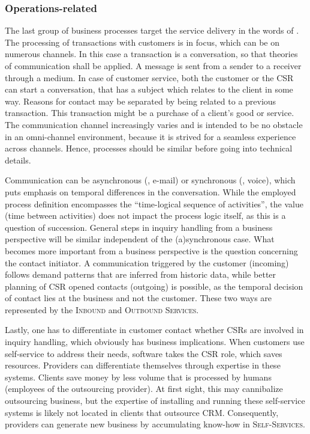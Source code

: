 	\subsubsection{Operations-related}
	The last group of business processes target the service delivery in the words of \citeauthor{schewe2007}. The processing of transactions with customers is in focus, which can be on numerous channels. In this case a transaction is a conversation, so that theories of communication \citep{shannon1949} shall be applied. A message is sent from a sender to a receiver through a medium. In case of customer service, both the customer or the \acrshort{CSR} can start a conversation, that has a subject which relates to the client in some way. Reasons for contact may be separated by being related to a previous transaction. This transaction might be a purchase of a client's good or service. The communication channel increasingly varies and is intended to be no obstacle in an omni-channel environment, because it is strived for a seamless experience across channels. Hence, processes should be similar before going into technical details. 
	
	Communication can be asynchronous (\eg, e-mail) or synchronous (\eg, voice), which puts emphasis on temporal differences in the conversation. While the employed process definition encompasses the \enquote{time-logical sequence of activities}, the value (\viz time between activities) does not impact the process logic itself, as this is a question of succession. General steps in inquiry handling from a business perspective will be similar independent of the (a)synchronous case. What becomes more important from a business perspective is the question concerning the contact initiator. A communication triggered by the customer (incoming) follows demand patterns that are inferred from historic data, while better planning of \acrshort{CSR} opened contacts (outgoing) is possible, as the temporal decision of contact lies at the business and not the customer. These two ways are represented by the \textsc{Inbound} and \textsc{Outbound Services}.
	
	Lastly, one has to differentiate in customer contact whether \acrshort{CSR}s are involved in inquiry handling, which obviously has business implications. When customers use self-service to address their needs, software takes the \acrshort{CSR} role, which saves resources. Providers can differentiate themselves through expertise in these systems. Clients save money by less volume that is processed by humans (employees of the outsourcing provider). At first sight, this may cannibalize outsourcing business, but the expertise of installing and running these self-service systems is likely not located in clients that outsource \acrshort{CRM}. Consequently, providers can generate new business by accumulating know-how in \textsc{Self-Services}. 
	
